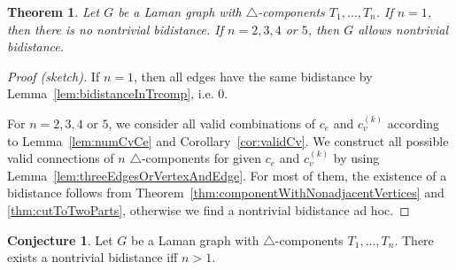 \documentclass[a4paper, 11pt]{article}
\newcommand{\trcomps}{$\triangle$-components}
\newcommand{\cv}[1]{c_v^{(#1)}}
\newtheorem{thm}{Theorem}[section]
\theoremstyle{definition}
\newtheorem{conj}{Conjecture}
\begin{document}
\begin{thm}
Let $G$ be a Laman graph with \trcomps{} $T_1,\dots, T_n$. If $n=1$, then there is no nontrivial bidistance. If $n=2,3,4$ or $5$, then $G$ allows nontrivial bidistance.
\end{thm}
\begin{proof}[Proof (sketch)]
If $n=1$, then all edges have the same bidistance by Lemma~\ref{lem:bidistanceInTrcomp}, i.e. 0.

For $n=2,3,4$ or $5$, we consider all valid combinations of $c_e$ and $\cv{k}$ according to Lemma~\ref{lem:numCvCe} and Corollary~\ref{cor:validCv}. We construct all possible valid connections of $n$ \trcomps{} for given $c_e$ and $\cv{k}$ by using Lemma~\ref{lem:threeEdgesOrVertexAndEdge}. For most of them, the existence of a bidistance follows from Theorem~\ref{thm:componentWithNonadjacentVertices} and \ref{thm:cutToTwoParts}, otherwise we find a nontrivial bidistance ad hoc.
\end{proof}

\begin{conj}
Let $G$ be a Laman graph with \trcomps{} $T_1,\dots, T_n$. There exists a nontrivial bidistance iff $n>1$.
\end{conj}
\end{document}
